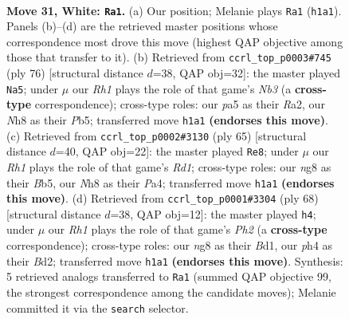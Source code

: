 \documentclass[11pt]{article}
\begin{document}
\clearpage

\begin{figure}[p]\centering
\begin{subfigure}{0.46\textwidth}\centering
\resizebox{\linewidth}{!}{%
\newchessgame
\chessboard[
  setfen={r1k3nN/3n4/8/pp4p1/4bb1p/7P/P4KP1/7R w - - 0 31},
  showmover=false,
  pgfstyle=straightmove, color=movearrow, markmove={h1-a1}
]}
\caption{}
\end{subfigure}\hfill
\begin{subfigure}{0.46\textwidth}\centering
\resizebox{\linewidth}{!}{%
\newchessgame
\chessboard[
  setfen={2k5/p1r2pp1/3b3p/1P2p3/2P5/1NK4P/R5P1/8 w - - 0 39},
  showmover=false,
  pgfstyle=straightmove, color=movearrow, markmove={b3-a5}
]}
\caption{}
\end{subfigure}
\\[4pt]
\begin{subfigure}{0.46\textwidth}\centering
\resizebox{\linewidth}{!}{%
\newchessgame
\chessboard[
  setfen={3r2k1/5p2/6pp/1b6/p6P/2Bn1PP1/B2P4/R5K1 b - - 2 33},
  showmover=false,
  pgfstyle=straightmove, color=movearrow, markmove={d8-e8}
]}
\caption{}
\end{subfigure}\hfill
\begin{subfigure}{0.46\textwidth}\centering
\resizebox{\linewidth}{!}{%
\newchessgame
\chessboard[
  setfen={4r2k/3p2p1/1p4P1/2b2R2/P1bp4/6P1/3B3P/3B2K1 w - - 0 35},
  showmover=false,
  pgfstyle=straightmove, color=movearrow, markmove={h2-h4}
]}
\caption{}
\end{subfigure}
\caption{\textbf{Move 31, White: \texttt{Ra1}.} (a) Our position; Melanie plays \texttt{Ra1} (\texttt{h1a1}). Panels (b)--(d) are the retrieved master positions whose correspondence most drove this move (highest QAP objective among those that transfer to it). (b) Retrieved from \texttt{ccrl\_top\_p0003\#745} (ply 76) [structural distance $d$=38, QAP obj=32]: the master played \texttt{Na5}; under $\mu$ our \emph{Rh1} plays the role of that game's \emph{Nb3} (a \textbf{cross-type} correspondence); cross-type roles: our \emph{p}a5 as their \emph{R}a2, our \emph{N}h8 as their \emph{P}b5; transferred move \texttt{h1a1} \textbf{(endorses this move)}. (c) Retrieved from \texttt{ccrl\_top\_p0002\#3130} (ply 65) [structural distance $d$=40, QAP obj=22]: the master played \texttt{Re8}; under $\mu$ our \emph{Rh1} plays the role of that game's \emph{Rd1}; cross-type roles: our \emph{n}g8 as their \emph{B}b5, our \emph{N}h8 as their \emph{P}a4; transferred move \texttt{h1a1} \textbf{(endorses this move)}. (d) Retrieved from \texttt{ccrl\_top\_p0001\#3304} (ply 68) [structural distance $d$=38, QAP obj=12]: the master played \texttt{h4}; under $\mu$ our \emph{Rh1} plays the role of that game's \emph{Ph2} (a \textbf{cross-type} correspondence); cross-type roles: our \emph{n}g8 as their \emph{B}d1, our \emph{p}h4 as their \emph{B}d2; transferred move \texttt{h1a1} \textbf{(endorses this move)}. Synthesis: 5 retrieved analogs transferred to \texttt{Ra1} (summed QAP objective 99, the strongest correspondence among the candidate moves); Melanie committed it via the \texttt{search} selector.}
\label{fig:thought-m60}
\end{figure}
\end{document}
